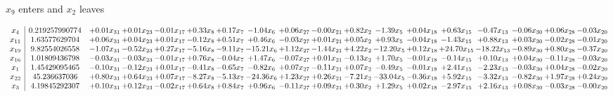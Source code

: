 \documentclass[9pt]{article}
\begin{document}
 $ x_{9} $ enters and $ x_{2} $ leaves 

 \[\begin{array}{c| c c@{\hskip 2pt} c@{\hskip 2pt} c@{\hskip 2pt} c@{\hskip 2pt} c@{\hskip 2pt} c@{\hskip 2pt} c@{\hskip 2pt} c@{\hskip 2pt} c@{\hskip 2pt} c@{\hskip 2pt} c@{\hskip 2pt} c@{\hskip 2pt} c@{\hskip 2pt} c@{\hskip 2pt} c@{\hskip 2pt} c@{\hskip 2pt} }
 x_{4}   &  0.219257990774 & +  0.01 x_{31} & +  0.01 x_{23} & -0.01 x_{17} & +  0.33 x_{8} & +  0.17 x_{7} & -1.04 x_{6} & +  0.06 x_{27} & -0.00 x_{21} & +  0.82 x_{2} & -1.39 x_{5} & +  0.04 x_{18} & +  0.63 x_{15} & -0.47 x_{13} & -0.06 x_{30} & +  0.06 x_{28} & -0.03 x_{20}\\
 x_{11}   &  1.63577629704 & +  0.06 x_{31} & +  0.04 x_{23} & +  0.01 x_{17} & -0.12 x_{8} & +  0.51 x_{7} & +  0.46 x_{6} & -0.03 x_{27} & +  0.01 x_{21} & +  0.05 x_{2} & +  0.93 x_{5} & -0.04 x_{18} & -1.43 x_{15} & +  0.88 x_{13} & +  0.03 x_{30} & -0.02 x_{28} & -0.01 x_{20}\\
 x_{19}   &  9.82554026558 & -1.07 x_{31} & -0.52 x_{23} & +  0.27 x_{17} & -5.16 x_{8} & -9.11 x_{7} & -15.21 x_{6} & +  1.12 x_{27} & -1.44 x_{21} & +  4.22 x_{2} & -12.20 x_{5} & +  0.12 x_{18} & + 24.70 x_{15} & -18.22 x_{13} & -0.89 x_{30} & +  0.80 x_{28} & -0.37 x_{20}\\
 x_{16}   &  1.01809436798 & -0.03 x_{31} & -0.03 x_{23} & -0.01 x_{17} & +  0.76 x_{8} & -0.04 x_{7} & +  1.47 x_{6} & -0.07 x_{27} & +  0.01 x_{21} & -0.13 x_{2} & +  1.70 x_{5} & -0.01 x_{18} & -0.14 x_{15} & +  0.10 x_{13} & +  0.04 x_{30} & -0.11 x_{28} & -0.03 x_{20}\\
 x_{1}   &  1.45429095465 & -0.10 x_{31} & -0.12 x_{23} & +  0.01 x_{17} & -0.41 x_{8} & -0.65 x_{7} & -0.82 x_{6} & +  0.07 x_{27} & -0.11 x_{21} & +  0.07 x_{2} & -0.49 x_{5} & -0.01 x_{18} & +  2.41 x_{15} & -2.23 x_{13} & -0.03 x_{30} & +  0.04 x_{28} & -0.02 x_{20}\\
 x_{22}   &  45.236637036 & +  0.80 x_{31} & +  0.64 x_{23} & +  0.07 x_{17} & -8.27 x_{8} & -5.13 x_{7} & -24.36 x_{6} & +  1.23 x_{27} & +  0.26 x_{21} & -7.21 x_{2} & -33.04 x_{5} & -0.36 x_{18} & +  5.92 x_{15} & -3.32 x_{13} & -0.82 x_{30} & +  1.97 x_{28} & +  0.24 x_{20}\\
 x_{3}   &  4.19845292307 & +  0.10 x_{31} & +  0.12 x_{23} & -0.02 x_{17} & +  0.64 x_{8} & +  0.84 x_{7} & +  0.96 x_{6} & -0.11 x_{27} & +  0.09 x_{21} & +  0.30 x_{2} & +  1.29 x_{5} & +  0.02 x_{18} & -2.97 x_{15} & +  2.16 x_{13} & +  0.08 x_{30} & -0.03 x_{28} & -0.00 x_{20}\\

\end{array}\]
\end{document}
